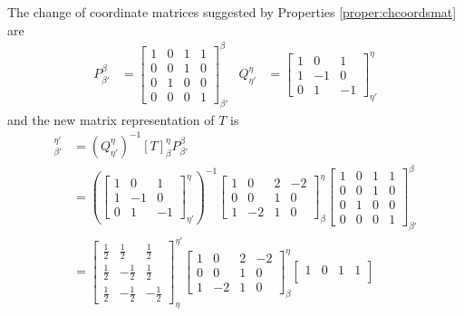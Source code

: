 \begin{solution}
The change of coordinate matrices suggested by Properties \ref{proper:chcoordsmat} are
\begin{align*}
P_{\beta'}^\beta &= 
\begin{bmatrix}
1 & 0 & 1 & 1 \\
0 & 0 & 1 & 0 \\
0 & 1 & 0 & 0 \\
0 & 0 & 0 & 1
\end{bmatrix}_{\beta'}^\beta
&
Q_{\eta'}^\eta &= 
\begin{bmatrix}
1 & 0 & 1 \\
1 & -1 & 0 \\
0 & 1 & -1
\end{bmatrix}_{\eta'}^\eta
\end{align*}
and the new matrix representation of $T$ is
\begin{align*}
[T]_{\beta'}^{\eta'} &= (Q_{\eta'}^\eta)^{-1} [T]_\beta^\eta P_{\beta'}^\beta \\
&= \left(\begin{bmatrix}
1 & 0 & 1 \\
1 & -1 & 0 \\
0 & 1 & -1
\end{bmatrix}_{\eta'}^\eta\right)^{-1}
\begin{bmatrix}
1 & 0 & 2 & -2 \\
0 & 0 & 1 & 0 \\
1 & -2 & 1 & 0
\end{bmatrix}_\beta^\eta
\begin{bmatrix}
1 & 0 & 1 & 1 \\
0 & 0 & 1 & 0 \\
0 & 1 & 0 & 0 \\
0 & 0 & 0 & 1
\end{bmatrix}_{\beta'}^\beta \\
&= \begin{bmatrix}
\frac{1}{2} & \frac{1}{2} & \frac{1}{2} \\
\frac{1}{2} & -\frac{1}{2} & \frac{1}{2} \\
\frac{1}{2} & -\frac{1}{2} & -\frac{1}{2}
\end{bmatrix}_{\eta}^{\eta'}
\begin{bmatrix}
1 & 0 & 2 & -2 \\
0 & 0 & 1 & 0 \\
1 & -2 & 1 & 0
\end{bmatrix}_\beta^\eta
\begin{bmatrix}
1 & 0 & 1 & 1 \\

\end{bmatrix}
\end{align*}
\end{solution}
